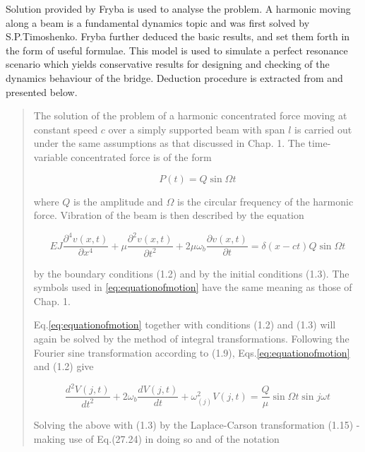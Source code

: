 Solution provided by Fryba\citet{fryba1999vibration} is used to analyse the problem. A harmonic moving along a beam is a fundamental dynamics topic and was first solved by S.P.Timoshenko. Fryba further deduced the basic results, and set them forth in the form of useful formulae. This model is used to simulate a perfect resonance scenario which yields conservative results for designing and checking of the dynamics behaviour of the bridge. Deduction procedure is extracted from \citet[Section II.2.1]{fryba1999vibration} and presented below.

\begin{quote}

The solution of the problem of a harmonic concentrated force moving at constant speed $c$ over a simply supported beam with span $l$ is carried out under the same assumptions as that discussed in Chap. 1. The time-variable concentrated force is of the form

\begin{equation}
    P(t) = Q \sin \Omega t
\end{equation}

where $Q$ is the amplitude and $\Omega$ is the circular frequency of the harmonic force. Vibration of the beam is then described by the equation

\begin{equation}\label{eq:equationofmotion}
    EJ\frac{\partial^4 v(x,t)}{\partial x^4} + \mu\frac{\partial^2 v(x,t)}{\partial t^2} +2\mu\omega_b \frac{\partial v(x,t)}{\partial t} = \delta(x-ct)Q\sin\Omega t 
\end{equation}

by the boundary conditions (1.2) and by the initial conditions (1.3). The symbols used in \ref{eq:equationofmotion} have the same meaning as those of Chap. 1.

Eq.\ref{eq:equationofmotion} together with conditions (1.2) and (1.3) will again be solved by the method of integral transformations. Following the Fourier sine transformation according to (1.9), Eqs.\ref{eq:equationofmotion} and (1.2) give

\begin{equation}
    \frac{d^2 V(j,t)}{d t^2} + 2\omega_b\frac{dV(j,t)}{dt} + \omega_{(j)}^2 V(j,t) = \frac{Q}{\mu} \sin\Omega t \sin j\omega t
\end{equation}

Solving the above with (1.3) by the Laplace-Carson transformation (1.15) - making use of Eq.(27.24) in doing so and of the notation


\end{quote}

